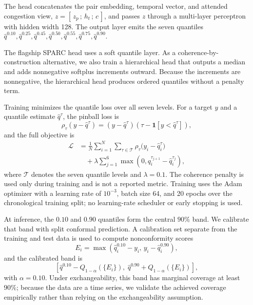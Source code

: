 \documentclass[twoside]{article}
\begin{document}
The head concatenates the pair embedding, temporal vector, and attended congestion view, $z = [\,z_p\,;\,h_t\,;\,c\,]$, and passes $z$ through a multi-layer perceptron with hidden width 128. The output layer emits the seven quantiles $\hat q^{0.10}, \hat q^{0.25}, \hat q^{0.45}, \hat q^{0.50}, \hat q^{0.55}, \hat q^{0.75}, \hat q^{0.90}$.

The flagship SPARC head uses a soft quantile layer. As a coherence-by-construction alternative, we also train a hierarchical head that outputs a median and adds nonnegative softplus increments outward. Because the increments are nonnegative, the hierarchical head produces ordered quantiles without a penalty term.

Training minimizes the quantile loss over all seven levels. For a target $y$ and a quantile estimate $\hat q^\tau$, the pinball loss is
\begin{equation}
\rho_\tau(y - \hat q^\tau)
= (y - \hat q^\tau)\left( \tau - \mathbf{1}[y < \hat q^\tau] \right),
\end{equation}
and the full objective is
\begin{equation}
\begin{split}
\mathcal{L}
&= \frac{1}{N} \sum_{i=1}^{N} \sum_{\tau \in \mathcal{T}}
\rho_\tau\bigl( y_i - \hat q_i^\tau \bigr) \\
&\quad + \lambda \sum_{j=1}^{6}
\max\!\left(0, \hat q_i^{\tau_{j+1}} - \hat q_i^{\tau_j}\right),
\end{split}
\end{equation}
where $\mathcal{T}$ denotes the seven quantile levels and $\lambda = 0.1$. The coherence penalty is used only during training and is not a reported metric. Training uses the Adam optimizer \citep{kingma2014adam} with a learning rate of $10^{-3}$, batch size 64, and 20 epochs over the chronological training split; no learning-rate scheduler or early stopping is used.

At inference, the $0.10$ and $0.90$ quantiles form the central $90\%$ band. We calibrate that band with split conformal prediction. A calibration set separate from the training and test data is used to compute nonconformity scores
\begin{equation}
E_i = \max\left( \hat q_i^{0.10} - y_i,\, y_i - \hat q_i^{0.90} \right),
\end{equation}
and the calibrated band is
\begin{equation}
\left[
\hat q^{0.10} - Q_{1-\alpha}(\{E_i\}),
\;
\hat q^{0.90} + Q_{1-\alpha}(\{E_i\})
\right],
\end{equation}
with $\alpha = 0.10$. Under exchangeability, this band has marginal coverage at least $90\%$; because the data are a time series, we validate the achieved coverage empirically rather than relying on the exchangeability assumption.
\end{document}
